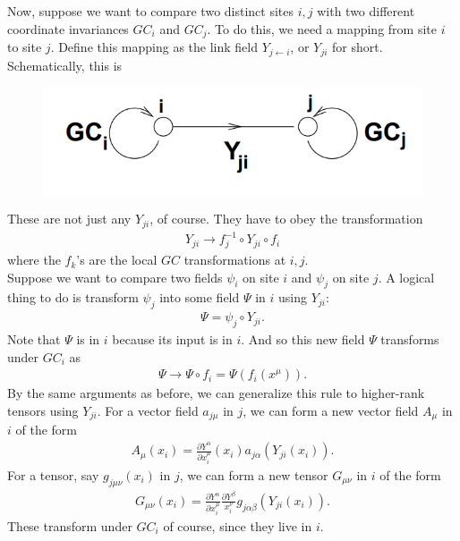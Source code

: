 \documentclass{book}
\theoremstyle{definition}
\newcommand{\p}{\partial}
\newcommand{\f}[2]{\frac{#1}{#2}}
\begin{document}
Now, suppose we want to compare two distinct sites $i,j$ with two different coordinate invariances $GC_i$ and $GC_j$. To do this, we need a mapping from site $i$ to site $j$. Define this mapping as the link field $Y_{j\leftarrow i}$, or $Y_{ji}$ for short. Schematically, this is 
\begin{figure}[!htb]
	\centering
	\includegraphics[scale=0.3]{link}
\end{figure}



These are not just any $Y_{ji}$, of course. They have to obey the transformation
\begin{align}
Y_{ji} \to f_j^{-1} \circ Y_{ji} \circ f_i
\end{align}
where the $f_k$'s are the local $GC$ transformations at $i,j$.\\

Suppose we want to compare two fields $\psi_i$ on site $i$ and $\psi_j$ on site $j$. A logical thing to do is transform $\psi_j$ into some field $\Psi$ in $i$ using $Y_{ji}$:
\begin{align}
\Psi = \psi_j \circ Y_{ji}.
\end{align}
Note that $\Psi$ is in $i$ because its input is in $i$. And so this new field $\Psi$ transforms under $GC_i$ as
\begin{align}
\Psi \to \Psi \circ f_i = \Psi(f_i(x^\mu)).
\end{align}
By the same arguments as before, we can generalize this rule to higher-rank tensors using $Y_{ji}$. For a vector field $a_{j\mu}$ in $j$, we can form a new vector field $A_\mu$ in $i$ of the form
\begin{align}
A_\mu(x_i) = \f{\p Y^\alpha}{\p x_i^\mu}(x_i) a_{j\alpha}(Y_{ji}(x_i)).
\end{align}
For a tensor, say $g_{j\mu\nu}(x_i)$ in $j$, we can form a new tensor $G_{\mu\nu}$ in $i$ of the form
\begin{align}
G_{\mu\nu}(x_i) = \f{\p Y^\alpha}{\p x_i^\mu}\f{\p Y^\beta}{x_i^\nu}g_{j\alpha\beta}(Y_{ji}(x_i)).
\end{align}
These transform under $GC_i$ of course, since they live in $i$.\\
\end{document}
